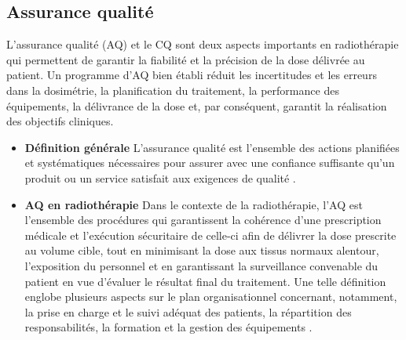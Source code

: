 \subsection{Assurance qualité}
L’assurance qualité (AQ)  et le CQ sont deux aspects importants en radiothérapie qui permettent de garantir la fiabilité et la précision de la dose délivrée au patient. Un programme d’AQ bien établi réduit les incertitudes et les erreurs dans la dosimétrie, la planification du traitement, la performance des équipements, la délivrance de la dose et, par conséquent, garantit la réalisation des objectifs cliniques.
%
\begin{itemize}[label=\textbullet, font=\LARGE]
	\item \textbf{Définition générale}\newline
	L'assurance qualité est l'ensemble des actions planifiées et systématiques nécessaires pour assurer avec une confiance 			suffisante qu'un produit ou un service satisfait aux exigences de qualité \cite{Podgorsak}.
	\item \textbf{AQ en radiothérapie} \newline
	Dans le contexte de la radiothérapie, l’AQ est l’ensemble des procédures qui garantissent la cohérence d’une prescription 		médicale et l’exécution sécuritaire de celle-ci afin de délivrer la dose prescrite au volume cible, tout en minimisant la dose 		aux tissus normaux alentour, l’exposition du personnel et en garantissant la surveillance convenable du patient en vue 			d’évaluer le résultat final du traitement. Une telle définition englobe plusieurs aspects sur le plan organisationnel 			concernant, notamment, la prise en charge et le suivi adéquat des patients, la répartition des responsabilités, la formation et 	la gestion des équipements \cite{Podgorsak, Lisbona}.
\end{itemize}
% 
